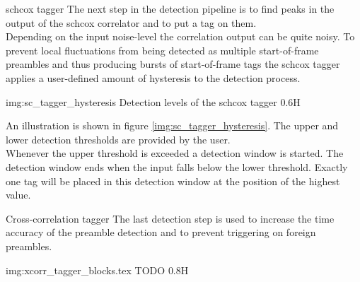 \begin{subchapter}{\acrlong{schcox} tagger}
  The next step in the detection pipeline is to find peaks in
  the output of the \acrlong{schcox} correlator and to put
  a tag on them. \\

  Depending on the input noise-level the correlation output
  can be quite noisy. To prevent local fluctuations from being
  detected as multiple start-of-frame preambles and thus producing
  bursts of start-of-frame tags the \acrshort{schcox} tagger
  applies a user-defined amount of hysteresis to the detection
  process.

               {img:sc_tagger_hysteresis}
               {Detection levels of the \acrshort{schcox} tagger}
               {0.6}{H}

  An illustration is shown in figure \ref{img:sc_tagger_hysteresis}.
  The upper and lower detection thresholds are provided by
  the user. \\

  Whenever the upper threshold is exceeded a detection window is started.
  The detection window ends when the input falls below the lower
  threshold.
  Exactly one tag will be placed in this detection window at
  the position of the highest value. 
\end{subchapter}

\begin{subchapter}{Cross-correlation tagger}
  The last detection step is used to increase the time accuracy
  of the preamble detection and to prevent triggering on foreign
  preambles.

               {img:xcorr_tagger_blocks.tex}
               {TODO}
               {0.8}{H}

  
\end{subchapter}
